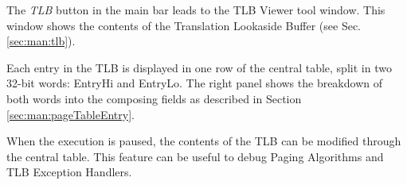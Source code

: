 
The \emph{TLB} button in the main bar leads to the TLB Viewer tool window.
This window shows the contents of the Translation Lookaside Buffer (see Sec. \ref{sec:man:tlb}).

Each entry in the TLB is displayed in one row of the central table, split in two 32-bit words: EntryHi and EntryLo.
The right panel shows the breakdown of both words into the composing fields as described in Section \ref{sec:man:pageTableEntry}.

When the execution is paused, the contents of the TLB can be modified through the central table. 
This feature can be useful to debug Paging Algorithms and TLB Exception Handlers.

